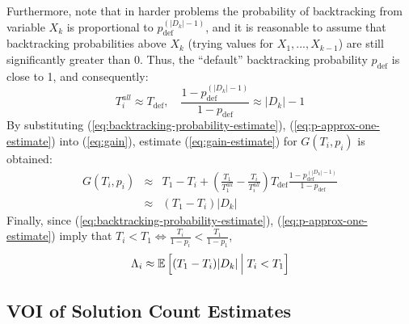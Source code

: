 Furthermore, note that in harder problems  the probability of
backtracking from variable $X_k$ is proportional to $p_\mathrm{def}^{(|D_k|-1)}$, and it is
reasonable to assume that backtracking probabilities above $X_k$
(trying values for $X_1, ..., X_{k-1}$)  are still significantly greater than 0.
Thus, the ``default'' backtracking
probability $p_\mathrm{def}$ is close to 1, and consequently:
\begin{equation}
  \label{eq:p-approx-one-estimate}
T_i^{all} \approx T_\mathrm{def},\quad\frac{1-p_\mathrm{def}^{(|D_k|-1)}}{1-p_\mathrm{def}} \approx |D_k|-1
\end{equation}
By substituting (\ref{eq:backtracking-probability-estimate}),
(\ref{eq:p-approx-one-estimate}) into (\ref{eq:gain}),
estimate (\ref{eq:gain-estimate}) for $G(T_i, p_i)$ is obtained:
\begin{eqnarray}
\label{eq:gain-estimate}
G(T_i, p_i)&\approx&T_1-T_i+(\frac {T_1} {T_1^{all}}-\frac {T_i} {T_i^{all}})T_\mathrm{def}\frac{1-p_\mathrm{def}^{(|D_k|-1)}}{1-p_\mathrm{def}}\nonumber\\
           &\approx&(T_1-T_i)|D_k|
\end{eqnarray}
Finally, since (\ref{eq:backtracking-probability-estimate}), (\ref{eq:p-approx-one-estimate}) imply that $T_i<T_1 \Leftrightarrow \frac {T_i} {1-p_i} < \frac {T_1} {1-p_1}$, 
\begin{eqnarray}
\label{eq:benefit-superestimate}
\Lambda_i\approx\mathbb{E}\left[(T_1-T_i)|D_k|\,\Big|\; T_i<T_1 \right]
\end{eqnarray}

\subsection{VOI of Solution Count Estimates}
\label{sec:csp-rational}

